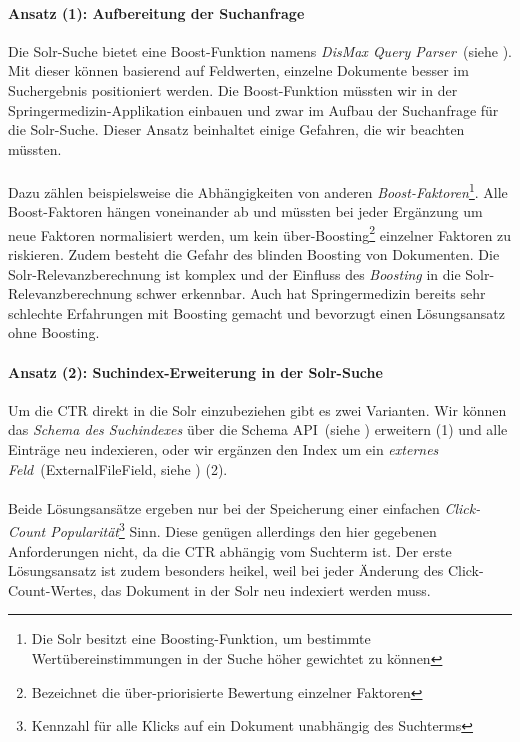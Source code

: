 \paragraph{Ansatz (1): Aufbereitung der Suchanfrage} Die Solr-Suche bietet eine Boost-Funktion namens \textit{DisMax Query Parser}~(siehe \cite{DisMax}). Mit dieser können basierend auf Feldwerten, einzelne Dokumente besser im Suchergebnis positioniert werden. Die Boost-Funktion müssten wir in der Springermedizin-Applikation einbauen und zwar im Aufbau der Suchanfrage für die Solr-Suche. Dieser Ansatz beinhaltet einige Gefahren, die wir beachten müssten.
\\
\\
Dazu zählen beispielsweise die Abhängigkeiten von anderen \textit{Boost-Faktoren}\footnote{Die Solr besitzt eine Boosting-Funktion, um bestimmte Wertübereinstimmungen in der Suche höher gewichtet zu können}. Alle Boost-Faktoren hängen voneinander ab und müssten bei jeder Ergänzung um neue Faktoren normalisiert werden, um kein \glqq über-Boosting\grqq{}\footnote{Bezeichnet die über-priorisierte Bewertung einzelner Faktoren} einzelner Faktoren zu riskieren. Zudem besteht die Gefahr des \glqq blinden Boosting\grqq{} von Dokumenten. Die Solr-Relevanzberechnung ist komplex und der Einfluss des \textit{Boosting} in die Solr-Relevanzberechnung schwer erkennbar. Auch hat Springermedizin bereits sehr schlechte Erfahrungen mit Boosting gemacht und bevorzugt einen Lösungsansatz ohne Boosting.

\paragraph{Ansatz (2): Suchindex-Erweiterung in der Solr-Suche}
Um die CTR direkt in die Solr einzubeziehen gibt es zwei Varianten. Wir können das \textit{Schema des Suchindexes} über die Schema API~(siehe \cite{SchemaAPISolr}) erweitern (1) und alle Einträge neu indexieren, oder wir ergänzen den Index um ein \textit{externes Feld}~(ExternalFileField, siehe \cite{ExtFieldSolr}) (2).
\\
\\
Beide Lösungsansätze ergeben nur bei der Speicherung einer einfachen \textit{Click-Count Popularität}\footnote{Kennzahl für alle Klicks auf ein Dokument unabhängig des Suchterms} Sinn. Diese genügen allerdings den hier gegebenen Anforderungen nicht, da die CTR abhängig vom Suchterm ist. Der erste Lösungsansatz ist zudem besonders heikel, weil bei jeder Änderung des Click-Count-Wertes, das Dokument in der Solr neu indexiert werden muss.

